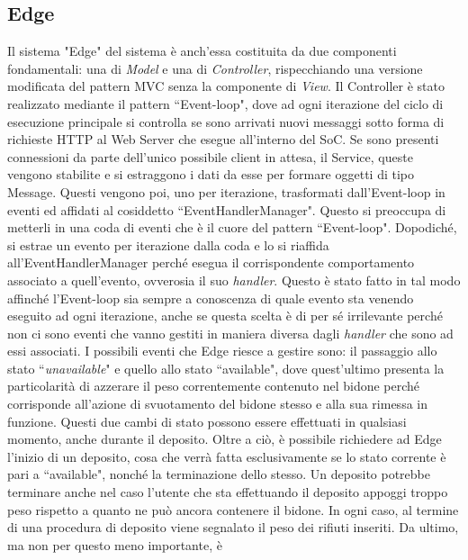 \documentclass[a4paper, 12pt]{report}
\begin{document}
			\subsection{Edge}
			Il sistema "Edge" del sistema è anch'essa costituita da due componenti fondamentali: una di
			\textit{Model} e una di \textit{Controller}, rispecchiando una versione modificata del
			pattern MVC senza la componente di \textit{View}.\newline
			Il Controller è stato realizzato mediante il pattern ``Event-loop", dove ad ogni iterazione
			del ciclo di esecuzione principale si controlla se sono arrivati nuovi messaggi sotto forma
			di richieste HTTP al Web Server che esegue all'interno del SoC. Se sono presenti connessioni
			da parte dell'unico possibile client in attesa, il Service, queste vengono stabilite e si
			estraggono i dati da esse per formare oggetti di tipo Message. Questi vengono poi, uno per
			iterazione, trasformati dall'Event-loop in eventi ed affidati al cosiddetto ``EventHandlerManager". Questo si preoccupa di metterli in una coda di eventi che è il cuore
			del pattern ``Event-loop". Dopodiché, si estrae un evento per iterazione dalla coda e lo si
			riaffida all'EventHandlerManager perché esegua il corrispondente comportamento associato a
			quell'evento, ovverosia il suo \textit{handler}. Questo è stato fatto in tal modo affinché
			l'Event-loop sia sempre a conoscenza di quale evento sta venendo eseguito ad ogni iterazione,
			anche se questa scelta è di per sé irrilevante perché non ci sono eventi che vanno gestiti in
			maniera diversa dagli \textit{handler} che sono ad essi associati.\newline
			I possibili eventi che
			Edge riesce a gestire sono: il passaggio allo stato ``\textit{unavailable}" e quello allo
			stato ``available", dove quest'ultimo presenta la particolarità di azzerare il peso
			correntemente contenuto nel bidone perché corrisponde all'azione di svuotamento del bidone
			stesso e alla sua rimessa in funzione. Questi due cambi di stato possono essere effettuati
			in qualsiasi momento, anche durante il deposito.
			Oltre a ciò, è possibile richiedere ad Edge l'inizio
			di un deposito, cosa che verrà fatta esclusivamente se lo stato corrente è pari a
			``available", nonché la terminazione dello stesso. Un deposito potrebbe terminare anche nel
			caso l'utente che sta effettuando il deposito appoggi troppo peso rispetto a quanto ne può
			ancora contenere il bidone. In ogni caso, al termine di una procedura di deposito viene
			segnalato il peso dei rifiuti inseriti. Da ultimo, ma non per questo meno importante, è
\end{document}
